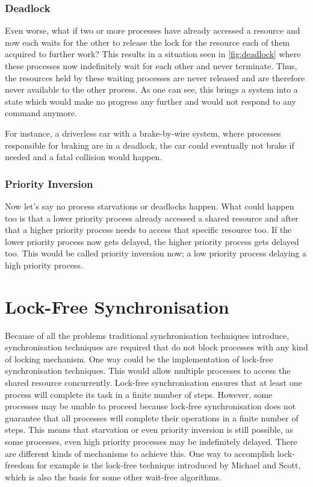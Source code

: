 \subsubsection{Deadlock}\label{subsubsec:deadlock}

Even worse, what if two or more processes have already accessed a resource and now each waits for the other to release the lock for the resource each of them acquired to further work? This results in a situation seen in \cref{fig:deadlock} where these processes now indefinitely wait for each other and never terminate. Thus, the resources held by these waiting processes are never released and are therefore never available to the other process. As one can see, this brings a system into a state which would make no progress any further and would not respond to any command anymore. \cite{chahar2013deadlock}

For instance, a driverless car with a brake-by-wire system, where processes responsible for braking are in a deadlock, the car could eventually not brake if needed and a fatal collision would happen. 


\subsubsection{Priority Inversion}\label{subsubsec:priority-inversion}

Now let's say no process starvations or deadlocks happen. What could happen too is that a lower priority process already accessed a shared resource and after that a higher priority process needs to access that specific resource too. If the lower priority process now gets delayed, the higher priority process gets delayed too. This would be called priority inversion now; a low priority process delaying a high priority process. \cite{priorityInversion}

\section{Lock-Free Synchronisation}\label{sec:lock-free}

Because of all the problems traditional synchronisation techniques introduce, synchronisation techniques are required that do not block processes with any kind of locking mechanism. One way could be the implementation of lock-free synchronisation techniques. This would allow multiple processes to access the shared resource concurrently. Lock-free synchronisation ensures that at least one process will complete its task in a finite number of steps. However, some processes may be unable to proceed because lock-free synchronisation does not guarantee that all processes will complete their operations in a finite number of steps. This means that starvation or even priority inversion is still possible, as some processes, even high priority processes may be indefinitely delayed. There are different kinds of mechanisms to achieve this. One way to accomplish lock-freedom for example is the lock-free technique introduced by Michael and Scott, which is also the basis for some other wait-free algorithms.

